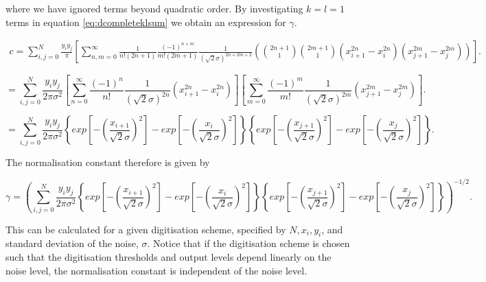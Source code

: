 \documentclass[apj]{emulateapj}
\begin{document}
where we have ignored terms beyond quadratic order. By investigating $k=l=1$ terms in equation \ref{eq:dcompleteklsum} we obtain an expression for $\gamma$.

\begin{equation}
\begin{aligned}
c = \sum_{i,j=0}^N  \frac{y_i y_j}{\pi} \left[ \sum_{n,m = 0}^\infty \frac{1}{n! (2n+1)} \frac{(-1)^{n+m}}{m! (2m+1)} \frac{1}{(\sqrt{2}\sigma)^{2n+2m+2}} \left( {2n+1 \choose 1} {2m+1 \choose 1} ( x_{i+1}^{2n} - x_{i}^{2n} ) ( x_{j+1}^{2m} - x_{j}^{2m} ) \right) \right] .
\end{aligned}
\end{equation}

\begin{equation}
= \sum_{i,j=0}^N \frac{y_i y_j}{2\pi\sigma^2} \left[ \sum_{n = 0}^\infty \frac{(-1)^n}{n!} \frac{1}{(\sqrt{2}\sigma)^{2n}}  ( x_{i+1}^{2n} - x_{i}^{2n} ) \right] \left[ \sum_{m = 0}^\infty \frac{(-1)^m}{m!} \frac{1}{(\sqrt{2}\sigma)^{2m}} ( x_{j+1}^{2m} - x_{j}^{2m} ) \right].
\end{equation}

\begin{equation}
= \sum_{i,j=0}^N \frac{y_i y_j}{2\pi\sigma^2} \left\{ exp \left[ - \left(\frac{x_{i+1}}{\sqrt{2}\sigma} \right)^2 \right] - exp \left[ - \left(\frac{x_{i}}{\sqrt{2}\sigma} \right)^2 \right] \right\} \left\{ exp \left[ - \left(\frac{x_{j+1}}{\sqrt{2}\sigma} \right)^2 \right] - exp \left[ - \left(\frac{x_{j}}{\sqrt{2}\sigma} \right)^2 \right] \right\} .
\end{equation}

The normalisation constant therefore is given by

\begin{equation}
\gamma = \left( \sum_{i,j=0}^N \frac{y_i y_j}{2\pi\sigma^2} \left\{ exp \left[ - \left(\frac{x_{i+1}}{\sqrt{2}\sigma} \right)^2 \right] - exp \left[ - \left(\frac{x_{i}}{\sqrt{2}\sigma} \right)^2 \right] \right\} \left\{ exp \left[ - \left(\frac{x_{j+1}}{\sqrt{2}\sigma} \right)^2 \right] - exp \left[ - \left(\frac{x_{j}}{\sqrt{2}\sigma} \right)^2 \right] \right\} \right)^{-1/2} .
\end{equation}

This can be calculated for a given digitisation scheme, specified by $N, x_i, y_i$, and standard deviation of the noise, $\sigma$. Notice that if the digitisation scheme is chosen such that the digitisation thresholds and output levels depend linearly on the noise level, the normalisation constant is independent of the noise level.



\end{document}
